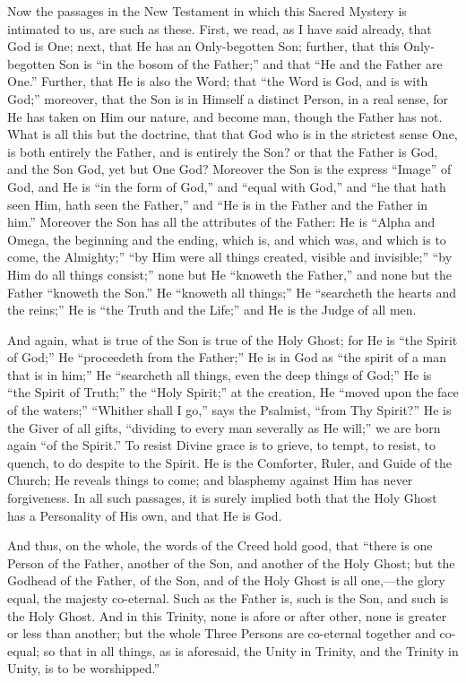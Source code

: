 Now the passages in the New Testament in which this Sacred Mystery
is intimated to us, are such as these. First, we read, as I have said
already, that God is One; next, that He has an Only-begotten Son;
further, that this Only-begotten Son is ``in the bosom of the
Father;'' and that ``He and the Father are One.'' Further,
that He is also the Word; that ``the Word is God, and is with
God;'' moreover, that the Son is in Himself a distinct Person, in
a real sense, for He has taken on Him our nature, and become man,
though the Father has not. What is all this but the doctrine, that
that God who is in the strictest sense One, is both entirely the
Father, and is entirely the Son? or that the Father is God, and the
Son God, yet but One God? Moreover the Son is the express
``Image'' of God, and He is ``in the form of God,''
and ``equal with God,'' and ``he that hath seen Him, hath
seen the Father,'' and ``He is in the Father and the Father in
him.'' Moreover the Son has all the attributes of the Father: He
is ``Alpha and Omega, the beginning and the ending, which is, and
which was, and which is to come, the Almighty;'' ``by Him were
all things created, visible and invisible;'' ``by Him do all
things consist;'' none but He ``knoweth the Father,'' and
none but the Father ``knoweth the Son.'' He ``knoweth all
things;'' He ``searcheth the hearts and the reins;'' He is
``the Truth and the Life;'' and He is the Judge of all men.

And again, what is true of the Son is true of the Holy Ghost; for
He is ``the Spirit of God;'' He ``proceedeth from the
Father;'' He is in God as ``the spirit of a man that is in
him;'' He ``searcheth all things, even the deep things of
God;'' He is ``the Spirit of Truth;'' the ``Holy
Spirit;'' at the creation, He ``moved upon the face of the
waters;'' ``Whither shall I go,'' says the Psalmist,
``from Thy Spirit?'' He is the Giver of all gifts,
``dividing to every man severally as He will;'' we are born
again ``of the Spirit.'' To resist Divine grace is to grieve,
to tempt, to resist, to quench, to do despite to the Spirit. He is the
Comforter, Ruler, and Guide of the Church; He reveals things to come;
and blasphemy against Him has never forgiveness. In all such passages,
it is surely implied both that the Holy Ghost has a Personality of His
own, and that He is God.

And thus, on the whole, the words of the Creed hold good, that
``there is one Person of the Father, another of the Son, and
another of the Holy Ghost; but the Godhead of the Father, of the Son,
and of the Holy Ghost is all one,—the glory equal, the majesty
co-eternal. Such as the Father is, such is the Son, and such is the
Holy Ghost. And in this Trinity, none is afore or after other, none is
greater or less than another; but the whole Three Persons are
co-eternal together and co-equal; so that in all things, as is
aforesaid, the Unity in Trinity, and the Trinity in Unity, is to be
worshipped.''

